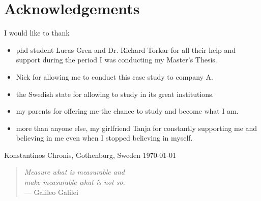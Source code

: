 \newpage
\clearpage
\mbox{}
\newpage
\clearpage
\thispagestyle{empty}
\section*{Acknowledgements}

I would like to thank
\begin{itemize}
	\item[] phd student Lucas Gren and Dr. Richard Torkar for all their help and support during the period I was conducting my Master's Thesis.
	\item[] Nick for allowing me to conduct this case study to company A.
	\item[] the Swedish state for allowing to study in its great institutions.
	\item[] my parents for offering me the chance to study and become what I am. 
	\item[] more than anyone else, my girlfriend Tanja for constantly supporting me and believing in me even when I stopped believing in myself. \\[1cm]
\end{itemize}

\hfill Konstantinos Chronis, Gothenburg, Sweden \today

\newpage
\clearpage
\vspace*{\fill} 
\begin{quote} 
\centering 
{\Large \textit{Measure what is measurable and}} \\ 
{\Large \textit{make measurable what is not so.}} \\ 
\hspace{7cm} --- Galileo Galilei
\end{quote}
\vspace*{\fill}
\mbox{}

\newpage
\clearpage
\mbox{}
